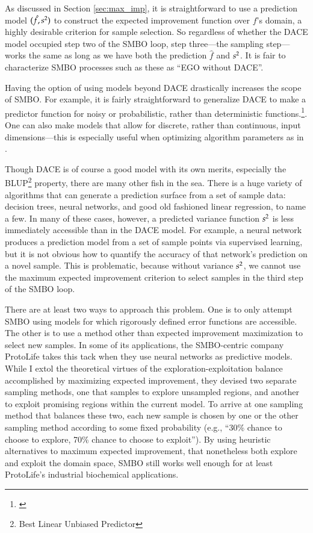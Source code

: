 As discussed in Section \ref{sec:max_imp}, it is straightforward to use a prediction model $(\hat{f},s^2)$ to construct the expected improvement function over $f$'s domain, a highly desirable criterion for sample selection. So regardless of whether the DACE model occupied step two of the SMBO loop, step three---the sampling step---works the same as long as we have both the prediction $\hat{f}$ and $s^2$. It is fair to characterize SMBO processes such as these as ``EGO without DACE''.

Having the option of using models beyond DACE drastically increases the scope of SMBO. For example, it is fairly straightforward to generalize DACE to make a predictor function for noisy or probabilistic, rather than deterministic functions.\footnote{\cite{jones_efficient_1998}}. One can also make models that allow for discrete, rather than continuous, input dimensions---this is especially useful when optimizing algorithm parameters as in \cite{hutter_sequential_2011}.

Though DACE is of course a good model with its own merits, especially the BLUP\footnote{Best Linear Unbiased Predictor} property, there are many other fish in the sea. There is a huge variety of algorithms that can generate a prediction surface from a set of sample data: decision trees, neural networks, and good old fashioned linear regression, to name a few.
In many of these cases, however, a predicted variance function $s^2$ is less immediately accessible than in the DACE model. For example, a neural network produces a prediction model from a set of sample points via supervised learning, but it is not obvious how to quantify the accuracy of that network's prediction on a novel sample. This is problematic, because without variance $s^2$, we cannot use the maximum expected improvement criterion to select samples in the third step of the SMBO loop.

There are at least two ways to approach this problem. One is to only attempt SMBO using models for which rigorously defined error functions are accessible. The other is to use a method other than expected improvement maximization to select new samples. In some of its applications, the SMBO-centric company ProtoLife takes this tack when they use neural networks as predictive models. While I extol the theoretical virtues of the exploration-exploitation balance accomplished by maximizing expected improvement, they devised two separate sampling methods, one that samples to explore unsampled regions, and another to exploit promising regions within the current model. To arrive at one sampling method that balances these two, each new sample is chosen by one or the other sampling method according to some fixed probability (e.g., ``30\% chance to choose to explore, 70\% chance to choose to exploit''). By using heuristic alternatives to maximum expected improvement, that nonetheless both explore and exploit the domain space, SMBO still works well enough for at least ProtoLife's industrial biochemical applications.

